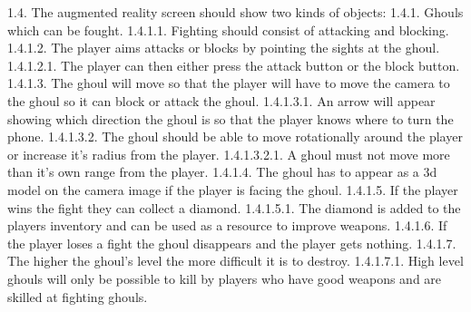 \documentclass{article}
\newcommand{\forceindent}{\leavevmode{\parindent=1em\indent}}
\begin{document}
		\forceindent 1.4. The augmented reality screen should show two kinds of objects:
		\forceindent \forceindent 1.4.1. Ghouls which can be fought.\newline
		\forceindent \forceindent \forceindent 1.4.1.1. Fighting should consist of attacking and blocking.\newline
		\forceindent \forceindent \forceindent 1.4.1.2. The player aims attacks or blocks by pointing the sights at the ghoul. \newline
		\forceindent \forceindent \forceindent \forceindent 1.4.1.2.1. The player can then either press the attack button or the block button.\newline
		\forceindent \forceindent \forceindent 1.4.1.3. The ghoul will move so that the player will have to move the camera to the ghoul so it can block or attack the ghoul.\newline
		\forceindent \forceindent \forceindent \forceindent 1.4.1.3.1. An arrow will appear showing which direction the ghoul is so that the player knows where to turn the phone.\newline
		\forceindent \forceindent \forceindent \forceindent 1.4.1.3.2. The ghoul should be able to move rotationally around the player or increase it's radius from the player.\newline
		\forceindent \forceindent \forceindent \forceindent \forceindent 1.4.1.3.2.1. A ghoul must not move more than it's own range from the player. \newline
		\forceindent \forceindent \forceindent  1.4.1.4. The ghoul has to appear as a 3d model on the camera image if the player is facing the ghoul.\newline
		\forceindent \forceindent \forceindent 1.4.1.5. If the player wins the fight they can collect a diamond.
		\forceindent \forceindent \forceindent \forceindent 1.4.1.5.1. The diamond is added to the players inventory and can be used as a resource to improve weapons.\newline
		\forceindent \forceindent \forceindent 1.4.1.6. If the player loses a fight the ghoul disappears and the player gets nothing.\newline
		\forceindent \forceindent \forceindent 1.4.1.7. The higher the ghoul's level the more difficult it is to destroy.\newline
		\forceindent \forceindent \forceindent \forceindent 1.4.1.7.1. High level ghouls will only be possible to kill by players who have good weapons and are skilled at fighting ghouls.\newline
\end{document}
